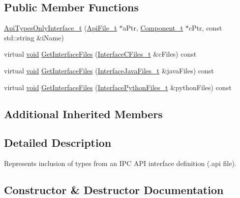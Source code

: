 \subsection*{Public Member Functions}
\begin{DoxyCompactItemize}
\item 
\hyperlink{struct_api_types_only_interface__t_aa14244dbd289c10f1686db50621af1fd}{Api\+Types\+Only\+Interface\+\_\+t} (\hyperlink{struct_api_file__t}{Api\+File\+\_\+t} $\ast$a\+Ptr, \hyperlink{struct_component__t}{Component\+\_\+t} $\ast$c\+Ptr, const std\+::string \&i\+Name)
\item 
virtual \hyperlink{_t_e_m_p_l_a_t_e__cdef_8h_ac9c84fa68bbad002983e35ce3663c686}{void} \hyperlink{struct_api_types_only_interface__t_a4fbfe4747c6ffaa029fc5313ac7ac600}{Get\+Interface\+Files} (\hyperlink{struct_interface_c_files__t}{Interface\+C\+Files\+\_\+t} \&c\+Files) const 
\item 
virtual \hyperlink{_t_e_m_p_l_a_t_e__cdef_8h_ac9c84fa68bbad002983e35ce3663c686}{void} \hyperlink{struct_api_types_only_interface__t_a97f22909def81cad9894456f159f1030}{Get\+Interface\+Files} (\hyperlink{struct_interface_java_files__t}{Interface\+Java\+Files\+\_\+t} \&java\+Files) const 
\item 
virtual \hyperlink{_t_e_m_p_l_a_t_e__cdef_8h_ac9c84fa68bbad002983e35ce3663c686}{void} \hyperlink{struct_api_types_only_interface__t_a1e9c94090a270caca9b3ad767253bd66}{Get\+Interface\+Files} (\hyperlink{struct_interface_python_files__t}{Interface\+Python\+Files\+\_\+t} \&python\+Files) const 
\end{DoxyCompactItemize}
\subsection*{Additional Inherited Members}


\subsection{Detailed Description}
Represents inclusion of types from an I\+PC A\+PI interface definition (.api file). 

\subsection{Constructor \& Destructor Documentation}
